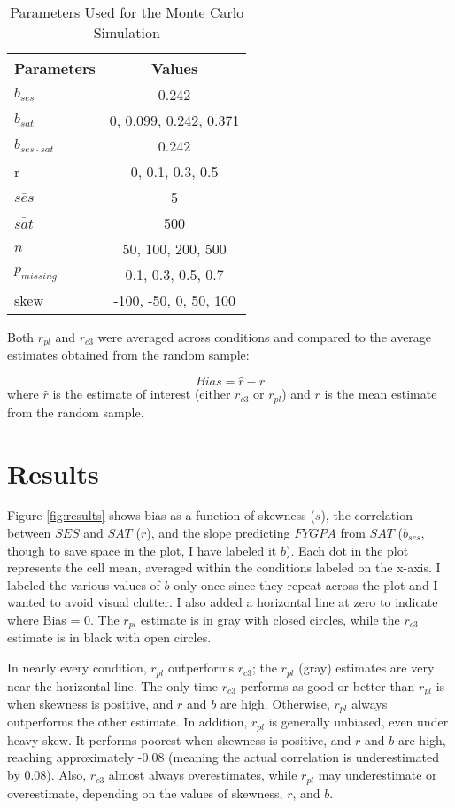 \documentclass[english,man]{apa6}
\theoremstyle{definition}
\theoremstyle{definition}
\theoremstyle{remark}
\begin{document}
\begin{table}[ht]
\centering
\caption{Parameters Used for the Monte Carlo Simulation} 
\label{tab:mcparams}
\begin{tabular}{lc}
  \hline
Parameters & Values \\ 
  \hline
$b_{ses}$ & 0.242 \\ 
  $b_{sat}$ & 0, 0.099, 0.242, 0.371 \\ 
  $b_{ses\cdot sat}$ & 0.242 \\ 
  r & 0, 0.1, 0.3, 0.5 \\ 
  $\bar{ses}$ & 5 \\ 
  $\bar{sat}$ & 500 \\ 
  $n$ & 50, 100, 200, 500 \\ 
  $p_{missing}$ & 0.1, 0.3, 0.5, 0.7 \\ 
  skew & -100, -50, 0, 50, 100 \\ 
   \hline
\end{tabular}
\end{table}

Both \(r_{pl}\) and \(r_{c3}\) were averaged across conditions and
compared to the average estimates obtained from the random sample:

\[Bias = \hat{r}-r\] \noindent where \(\hat{r}\) is the estimate of
interest (either \(r_{c3}\) or \(r_{pl}\)) and \(r\) is the mean
estimate from the random sample.

\section{Results}\label{results}

Figure \ref{fig:results} shows bias as a function of skewness (\(s\)),
the correlation between \(SES\) and \(SAT\) (\(r\)), and the slope
predicting \(FYGPA\) from \(SAT\) (\(b_{ses}\), though to save space in
the plot, I have labeled it \(b\)). Each dot in the plot represents the
cell mean, averaged within the conditions labeled on the x-axis. I
labeled the various values of \(b\) only once since they repeat across
the plot and I wanted to avoid visual clutter. I also added a horizontal
line at zero to indicate where Bias = 0. The \(r_{pl}\) estimate is in
gray with closed circles, while the \(r_{c3}\) estimate is in black with
open circles.

In nearly every condition, \(r_{pl}\) outperforms \(r_{c3}\); the
\(r_{pl}\) (gray) estimates are very near the horizontal line. The only
time \(r_{c3}\) performs as good or better than \(r_{pl}\) is when
skewness is positive, and \(r\) and \(b\) are high. Otherwise,
\(r_{pl}\) always outperforms the other estimate. In addition,
\(r_{pl}\) is generally unbiased, even under heavy skew. It performs
poorest when skewness is positive, and \(r\) and \(b\) are high,
reaching approximately -0.08 (meaning the actual correlation is
underestimated by 0.08). Also, \(r_{c3}\) almost always overestimates,
while \(r_{pl}\) may underestimate or overestimate, depending on the
values of skewness, \(r\), and \(b\).
\end{document}
